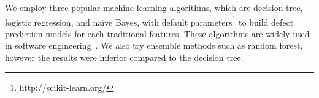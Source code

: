We employ three popular machine learning algorithms, which are decision tree, logistic regression, and na\"{i}ve Bayes, with default parameters\footnote{http://scikit-learn.org/} to build defect prediction models for each traditional features. These algorithms are widely used in software engineering~\cite{wang2016automatically, jing2014dictionary}. We also try ensemble methods such as random forest, however the results were inferior compared to the decision tree. 

